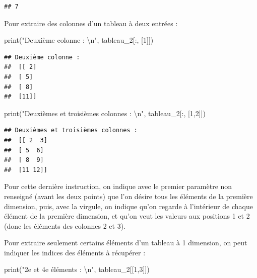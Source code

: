 \documentclass[
  12pt,
]{book}
\newenvironment{Shaded}{\begin{snugshade}}{\end{snugshade}}
\newcommand{\BuiltInTok}[1]{#1}
\newcommand{\CharTok}[1]{\textcolor[rgb]{0.31,0.60,0.02}{#1}}
\newcommand{\DecValTok}[1]{\textcolor[rgb]{0.00,0.00,0.81}{#1}}
\newcommand{\NormalTok}[1]{#1}
\newcommand{\StringTok}[1]{\textcolor[rgb]{0.31,0.60,0.02}{#1}}
\numberwithin{equation}{section}
\numberwithin{countremarque}{section}
\begin{document}
\begin{lstlisting}
## 7
\end{lstlisting}

Pour extraire des colonnes d'un tableau à deux entrées :

\begin{Shaded}
\begin{Highlighting}[]
\BuiltInTok{print}\NormalTok{(}\StringTok{"Deuxième colonne : }\CharTok{\textbackslash{}n}\StringTok{"}\NormalTok{, tableau\_2[:, [}\DecValTok{1}\NormalTok{]])}
\end{Highlighting}
\end{Shaded}

\begin{lstlisting}
## Deuxième colonne : 
##  [[ 2]
##  [ 5]
##  [ 8]
##  [11]]
\end{lstlisting}

\begin{Shaded}
\begin{Highlighting}[]
\BuiltInTok{print}\NormalTok{(}\StringTok{"Deuxièmes et troisièmes colonnes : }\CharTok{\textbackslash{}n}\StringTok{"}\NormalTok{, tableau\_2[:, [}\DecValTok{1}\NormalTok{,}\DecValTok{2}\NormalTok{]])}
\end{Highlighting}
\end{Shaded}

\begin{lstlisting}
## Deuxièmes et troisièmes colonnes : 
##  [[ 2  3]
##  [ 5  6]
##  [ 8  9]
##  [11 12]]
\end{lstlisting}

Pour cette dernière instruction, on indique avec le premier paramètre non renseigné (avant les deux points) que l'on désire tous les éléments de la première dimension, puis, avec la virgule, on indique qu'on regarde à l'intérieur de chaque élément de la première dimension, et qu'on veut les valeurs aux positions 1 et 2 (donc les éléments des colonnes 2 et 3).

Pour extraire seulement certains éléments d'un tableau à 1 dimension, on peut indiquer les indices des éléments à récupérer :

\begin{Shaded}
\begin{Highlighting}[]
\BuiltInTok{print}\NormalTok{(}\StringTok{"2e et 4e éléments : }\CharTok{\textbackslash{}n}\StringTok{"}\NormalTok{, tableau\_2[[}\DecValTok{1}\NormalTok{,}\DecValTok{3}\NormalTok{]])}
\end{Highlighting}
\end{Shaded}
\end{document}
